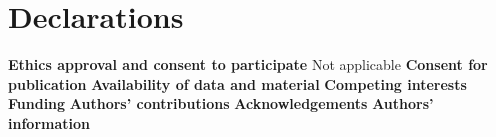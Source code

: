\documentclass[11pt]{article}
\begin{document}

\section{Declarations}
\textbf{Ethics approval and consent to participate}
Not applicable
\textbf{Consent for publication}
\textbf{Availability of data and material}
\textbf{Competing interests}
\textbf{Funding}
\textbf{Authors' contributions}
\textbf{Acknowledgements}
\textbf{Authors' information}



\end{document}
